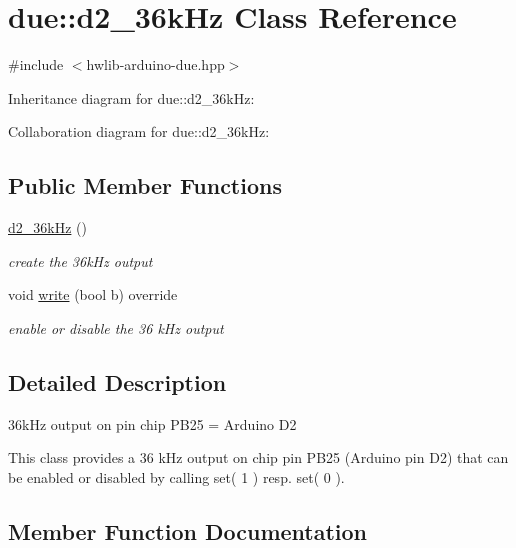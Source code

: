 \hypertarget{classdue_1_1d2__36kHz}{}\section{due\+:\+:d2\+\_\+36k\+Hz Class Reference}
\label{classdue_1_1d2__36kHz}


{\ttfamily \#include $<$hwlib-\/arduino-\/due.\+hpp$>$}



Inheritance diagram for due\+:\+:d2\+\_\+36k\+Hz\+:


Collaboration diagram for due\+:\+:d2\+\_\+36k\+Hz\+:
\subsection*{Public Member Functions}
\begin{DoxyCompactItemize}
\item 
\mbox{\label{classdue_1_1d2__36kHz_a9172955a5667b99410897e2cabed24d2}} 
\hyperlink{classdue_1_1d2__36kHz_a9172955a5667b99410897e2cabed24d2}{d2\+\_\+36k\+Hz} ()
\begin{DoxyCompactList}\small\item\em create the 36k\+Hz output \end{DoxyCompactList}\item 
void \hyperlink{classdue_1_1d2__36kHz_a21694f90fcb5b29d0839f98e473bfedb}{write} (bool b) override
\begin{DoxyCompactList}\small\item\em enable or disable the 36 k\+Hz output \end{DoxyCompactList}\end{DoxyCompactItemize}


\subsection{Detailed Description}
36k\+Hz output on pin chip P\+B25 = Arduino D2

This class provides a 36 k\+Hz output on chip pin P\+B25 (Arduino pin D2) that can be enabled or disabled by calling set( 1 ) resp. set( 0 ). 

\subsection{Member Function Documentation}
\mbox{\label{classdue_1_1d2__36kHz_a21694f90fcb5b29d0839f98e473bfedb}} 

